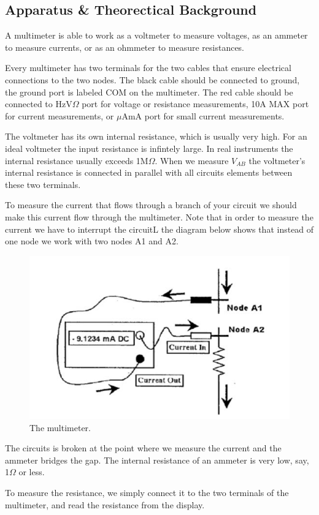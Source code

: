 \documentclass[a4paper]{report}
\begin{document}
	\subsection{Apparatus \& Theorectical Background}
	A multimeter is able to work as a voltmeter to measure voltages, as an ammeter to measure currents, or as an ohmmeter to measure resistances.
	
	Every multimeter has two terminals for the two cables that ensure electrical connections to the two nodes. The black cable should be connected to ground, the ground port is labeled COM on the multimeter. The red cable should be connected to HzV$\Omega$ port for voltage or resistance measurements, 10A MAX port for current measurements, or $\mu$AmA port for small current measurements.
	
	The voltmeter has its own internal resistance, which is usually very high. For an ideal voltmeter the input resistance is infintely large. In real instruments the internal resistance usually exceeds 1M$\Omega$. When we measure $V_{AB}$ the voltmeter's internal resistance is connected in parallel with all circuits elements between these two terminals.
	
	To measure the current that flows through a branch of your circuit we should make this current flow through the multimeter. Note that in order to measure the current we have to interrupt the circuitL the diagram below shows that instead of one node we work with two nodes A1 and A2.
	\begin{figure}[H]
		\centering
		\includegraphics[width=0.7\linewidth]{1.jpg}
		\caption{The multimeter.}
	\end{figure}
	The circuits is broken at the point where we measure the current and the ammeter bridges the gap. The internal resistance of an ammeter is very low, say, 1$\Omega$ or less.
	
	To measure the resistance, we simply connect it to the two terminals of the multimeter, and read the resistance from the display.
	
\end{document}
